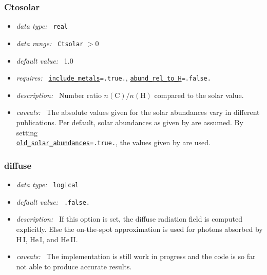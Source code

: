 \documentclass[a4paper,10pt]{article}
\begin{document}
\subsubsection{Ctosolar}
\label{opt:ctosolar}
\begin{itemize}
 \item \textit{data type:~} \texttt{real}
 \item \textit{data range:~} \texttt{Ctsolar} $> 0$
 \item \textit{default value:~} 1.0
 \item \textit{requires:~} \texttt{\hyperref[opt:includemetals]{include\_metals}=.true.},
 \texttt{\hyperref[opt:abundreltoh]{abund\_rel\_to\_H}=.false.}
 \item \textit{description:~} Number ratio $n(\mathrm{C})/n(\mathrm{H})$ 
 compared to the solar value.
 \item \textit{caveats:~} The absolute values given for the solar abundances 
  vary in different publications. Per default, solar abundances as given by 
  \cite{Asplund2009} are assumed. By setting \\
  \texttt{\hyperref[opt:oldsolarabundances]{old\_solar\_abundances}=.true.}, 
  the values given by \cite{Grevesse1998} are used.
\end{itemize}


\subsubsection{diffuse}
\label{opt:diffuse}
\begin{itemize}
 \item \textit{data type:~} \texttt{logical}
 \item \textit{default value:~} \texttt{.false.}
 \item \textit{description:~} If this option is set, the diffuse radiation field 
 is computed explicitly. Else the on-the-spot approximation is used for photons 
 absorbed by H\,I, He\,I, and He\,II. 
 \item \textit{caveats:~} The implementation is still work in progress and the 
 code is so far not able to produce accurate results.
\end{itemize}
\end{document}
